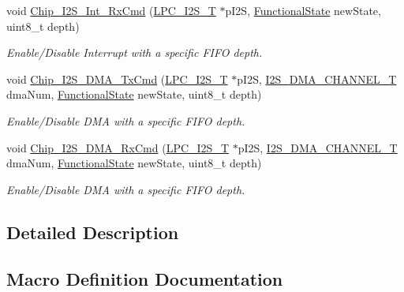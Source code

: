 \begin{DoxyCompactItemize}
void \hyperlink{group___i2_s__18_x_x__43_x_x_ga36b0f5c62d5c703c1374bdcc0d84d07f}{Chip\+\_\+\+I2\+S\+\_\+\+Int\+\_\+\+Rx\+Cmd} (\hyperlink{struct_l_p_c___i2_s___t}{L\+P\+C\+\_\+\+I2\+S\+\_\+T} $\ast$p\+I2S, \hyperlink{group___l_p_c___types___public___types_gac9a7e9a35d2513ec15c3b537aaa4fba1}{Functional\+State} new\+State, uint8\+\_\+t depth)
\begin{DoxyCompactList}\small\item\em Enable/\+Disable Interrupt with a specific F\+I\+FO depth. \end{DoxyCompactList}\item 
void \hyperlink{group___i2_s__18_x_x__43_x_x_gac08890ba38fd8e5df3a3a603e7a4fa42}{Chip\+\_\+\+I2\+S\+\_\+\+D\+M\+A\+\_\+\+Tx\+Cmd} (\hyperlink{struct_l_p_c___i2_s___t}{L\+P\+C\+\_\+\+I2\+S\+\_\+T} $\ast$p\+I2S, \hyperlink{group___i2_s__18_x_x__43_x_x_gac04c1583101ddd661886d9677683421b}{I2\+S\+\_\+\+D\+M\+A\+\_\+\+C\+H\+A\+N\+N\+E\+L\+\_\+T} dma\+Num, \hyperlink{group___l_p_c___types___public___types_gac9a7e9a35d2513ec15c3b537aaa4fba1}{Functional\+State} new\+State, uint8\+\_\+t depth)
\begin{DoxyCompactList}\small\item\em Enable/\+Disable D\+MA with a specific F\+I\+FO depth. \end{DoxyCompactList}\item 
void \hyperlink{group___i2_s__18_x_x__43_x_x_ga9c7067a9ee62d240aa6cd9426deefb13}{Chip\+\_\+\+I2\+S\+\_\+\+D\+M\+A\+\_\+\+Rx\+Cmd} (\hyperlink{struct_l_p_c___i2_s___t}{L\+P\+C\+\_\+\+I2\+S\+\_\+T} $\ast$p\+I2S, \hyperlink{group___i2_s__18_x_x__43_x_x_gac04c1583101ddd661886d9677683421b}{I2\+S\+\_\+\+D\+M\+A\+\_\+\+C\+H\+A\+N\+N\+E\+L\+\_\+T} dma\+Num, \hyperlink{group___l_p_c___types___public___types_gac9a7e9a35d2513ec15c3b537aaa4fba1}{Functional\+State} new\+State, uint8\+\_\+t depth)
\begin{DoxyCompactList}\small\item\em Enable/\+Disable D\+MA with a specific F\+I\+FO depth. \end{DoxyCompactList}\end{DoxyCompactItemize}


\subsection{Detailed Description}


\subsection{Macro Definition Documentation}
\mbox{\label{group___i2_s__18_x_x__43_x_x_ga352feb095d028efc44d17f72beacfae5}} 
